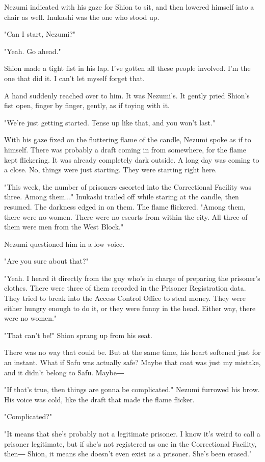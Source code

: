 Nezumi indicated with his gaze for Shion to sit, and then lowered
himself into a chair as well. Inukashi was the one who stood up.

"Can I start, Nezumi?"

"Yeah. Go ahead."

Shion made a tight fist in his lap. I've gotten all these people
involved. I'm the one that did it. I can't let myself forget that.

A hand suddenly reached over to him. It was Nezumi's. It gently pried
Shion's fist open, finger by finger, gently, as if toying with it.

"We're just getting started. Tense up like that, and you won't last."

With his gaze fixed on the fluttering flame of the candle, Nezumi spoke
as if to himself. There was probably a draft coming in from somewhere,
for the flame kept flickering. It was already completely dark outside. A
long day was coming to a close. No, things were just starting. They were
starting right here.

"This week, the number of prisoners escorted into the Correctional
Facility was three. Among them..." Inukashi trailed off while staring at
the candle, then resumed. The darkness edged in on them. The flame
flickered. "Among them, there were no women. There were no escorts from
within the city. All three of them were men from the West Block."

Nezumi questioned him in a low voice.

"Are you sure about that?"

"Yeah. I heard it directly from the guy who's in charge of preparing the
prisoner's clothes. There were three of them recorded in the Prisoner
Registration data. They tried to break into the Access Control Office to
steal money. They were either hungry enough to do it, or they were funny
in the head. Either way, there were no women."

"That can't be!" Shion sprang up from his seat.

There was no way that could be. But at the same time, his heart softened
just for an instant. What if Safu was actually safe? Maybe that coat was
just my mistake, and it didn't belong to Safu. Maybe―

"If that's true, then things are gonna be complicated." Nezumi furrowed
his brow. His voice was cold, like the draft that made the flame
flicker.

"Complicated?"

"It means that she's probably not a legitimate prisoner. I know it's
weird to call a prisoner legitimate, but if she's not registered as one
in the Correctional Facility, then― Shion, it means she doesn't even
exist as a prisoner. She's been erased."

